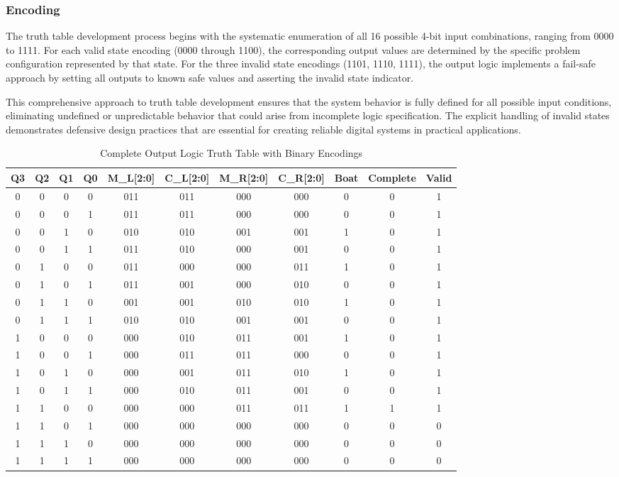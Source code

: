 \documentclass[10pt,a4paper]{article}
\begin{document}
\subsubsection*{Encoding}

The truth table development process begins with the systematic enumeration of all 16 possible 4-bit input combinations, ranging from 0000 to 1111. For each valid state encoding (0000 through 1100), the corresponding output values are determined by the specific problem configuration represented by that state. For the three invalid state encodings (1101, 1110, 1111), the output logic implements a fail-safe approach by setting all outputs to known safe values and asserting the invalid state indicator.

\noindent This comprehensive approach to truth table development ensures that the system behavior is fully defined for all possible input conditions, eliminating undefined or unpredictable behavior that could arise from incomplete logic specification. The explicit handling of invalid states demonstrates defensive design practices that are essential for creating reliable digital systems in practical applications.

\begin{table}[H]
\centering
\footnotesize
\begin{tabular}{|c|c|c|c|c|c|c|c|c|c|c|}
\hline
\textbf{Q3} & \textbf{Q2} & \textbf{Q1} & \textbf{Q0} & \textbf{M\_L[2:0]} & \textbf{C\_L[2:0]} & \textbf{M\_R[2:0]} & \textbf{C\_R[2:0]} & \textbf{Boat} & \textbf{Complete} & \textbf{Valid} \\
\hline
0 & 0 & 0 & 0 & 011 & 011 & 000 & 000 & 0 & 0 & 1 \\
0 & 0 & 0 & 1 & 011 & 011 & 000 & 000 & 0 & 0 & 1 \\
0 & 0 & 1 & 0 & 010 & 010 & 001 & 001 & 1 & 0 & 1 \\
0 & 0 & 1 & 1 & 011 & 010 & 000 & 001 & 0 & 0 & 1 \\
0 & 1 & 0 & 0 & 011 & 000 & 000 & 011 & 1 & 0 & 1 \\
0 & 1 & 0 & 1 & 011 & 001 & 000 & 010 & 0 & 0 & 1 \\
0 & 1 & 1 & 0 & 001 & 001 & 010 & 010 & 1 & 0 & 1 \\
0 & 1 & 1 & 1 & 010 & 010 & 001 & 001 & 0 & 0 & 1 \\
1 & 0 & 0 & 0 & 000 & 010 & 011 & 001 & 1 & 0 & 1 \\
1 & 0 & 0 & 1 & 000 & 011 & 011 & 000 & 0 & 0 & 1 \\
1 & 0 & 1 & 0 & 000 & 001 & 011 & 010 & 1 & 0 & 1 \\
1 & 0 & 1 & 1 & 000 & 010 & 011 & 001 & 0 & 0 & 1 \\
1 & 1 & 0 & 0 & 000 & 000 & 011 & 011 & 1 & 1 & 1 \\
1 & 1 & 0 & 1 & 000 & 000 & 000 & 000 & 0 & 0 & 0 \\
1 & 1 & 1 & 0 & 000 & 000 & 000 & 000 & 0 & 0 & 0 \\
1 & 1 & 1 & 1 & 000 & 000 & 000 & 000 & 0 & 0 & 0 \\
\hline
\end{tabular}
\caption{Complete Output Logic Truth Table with Binary Encodings}
\end{table}
\end{document}
